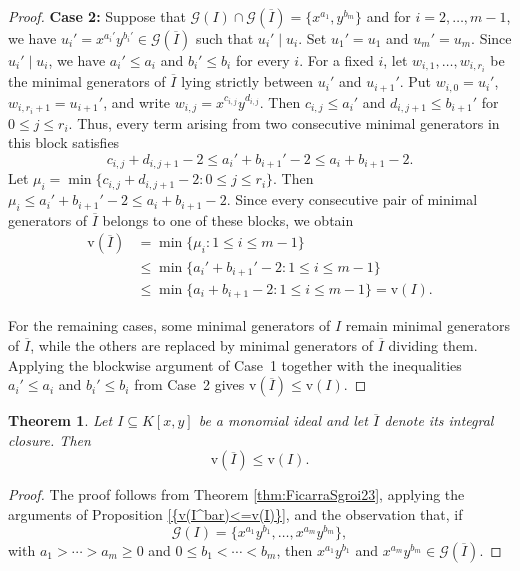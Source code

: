 \documentclass[11pt,reqno,a4paper]{amsart}
\newtheorem{theorem}{Theorem}[section]
\theoremstyle{definition}
\begin{document}
\begin{proof}
\noindent\textbf{Case 2:}
Suppose that
\(\mathcal{G}(I)\cap \mathcal{G}(\overline{I})=\{x^{a_1},y^{b_m}\}\) 
and for \(i = 2, \ldots, m-1\), we have
\(u_i'=x^{a_i'}y^{b_i'}\in \mathcal{G}(\overline{I})\) such that
\(u_i'\mid u_i\). Set
\(u_1'=u_1\) and \(u_m'=u_m\). Since \(u_i'\mid u_i\), we have
\(a_i'\leq a_i\) and \(b_i'\leq b_i\) for every \(i\). For a fixed \(i\), let
\(w_{i,1},\ldots,w_{i,r_i}\) be the minimal generators of
\(\overline{I}\) lying strictly between \(u_i'\) and \(u_{i+1}'\).
Put \(w_{i,0}=u_i'\), \(w_{i,r_i+1}=u_{i+1}'\), and write
\(w_{i,j}=x^{c_{i,j}}y^{d_{i,j}}\). Then
\(c_{i,j}\leq a_i'\) and \(d_{i,j+1}\leq b_{i+1}'\) for
\(0\leq j\leq r_i\). Thus, every term arising from two consecutive
minimal generators in this block satisfies
\[
c_{i,j}+d_{i,j+1}-2
\leq a_i'+b_{i+1}'-2
\leq a_i+b_{i+1}-2.
\]
Let
\(\mu_i=\min\{c_{i,j}+d_{i,j+1}-2:0\leq j\leq r_i\}\).
Then
\(\mu_i\leq a_i'+b_{i+1}'-2\leq a_i+b_{i+1}-2\).
Since every consecutive pair of minimal generators of
\(\overline{I}\) belongs to one of these blocks, we obtain
\[
\begin{aligned}
\mathrm{v}(\overline{I})
&=\min\{\mu_i:1\leq i\leq m-1\}\\
&\leq
\min\{a_i'+b_{i+1}'-2:1\leq i\leq m-1\}\\
&\leq
\min\{a_i+b_{i+1}-2:1\leq i\leq m-1\}
=\mathrm{v}(I).
\end{aligned}
\]

\noindent For the remaining cases, some minimal generators of \(I\) remain
minimal generators of \(\overline{I}\), while the others are replaced
by minimal generators of \(\overline{I}\) dividing them. Applying the
blockwise argument of Case~1 together with the inequalities
\(a_i'\leq a_i\) and \(b_i'\leq b_i\) from Case~2 gives
\(\mathrm{v}(\overline{I})\leq\mathrm{v}(I)\).
\end{proof}





\begin{theorem}\label{2variablesproof}
Let \(I \subseteq K[x,y]\) be a monomial ideal and let \(\overline{I}\) denote its integral closure. Then
\[
\mathrm{v}(\overline{I}) \le \mathrm{v}(I).
\]
\end{theorem}



\begin{proof}
The proof follows from Theorem \ref{thm:FicarraSgroi23}, applying the arguments of Proposition \ref{{v(I^bar)<=v(I)}}, and the observation that, if
\[
\mathcal{G}(I)=\{x^{a_1}y^{b_1},\ldots,x^{a_m}y^{b_m}\},
\]
with \(a_1>\cdots>a_m\geq 0\) and \(0\leq b_1<\cdots<b_m\), then \(x^{a_1}y^{b_1}\) and \(x^{a_m}y^{b_m} \in \mathcal{G}(\overline{I})\).
\end{proof}
\end{document}
